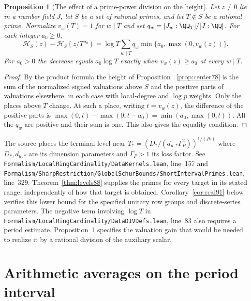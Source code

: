 \documentclass[a4paper,11pt]{article}
\newtheorem{proposition}{Proposition}[section]
\theoremstyle{definition}
\theoremstyle{remark}
\newcommand{\srcloc}[2]{{\small\nolinkurl{#1.lean}}, line~#2}
\numberwithin{equation}{section}
\begin{document}
\begin{proposition}[The effect of a prime-power division on the height]
\label{prop:height88}
Let \(z\ne0\) lie in a number field \(J\), let \(S\) be a set of
rational primes, and let \(T\notin S\) be a rational prime.
Normalize \(v_w(T)=1\) for \(w\mid T\) and set
\(q_w=[J_w:\QQ_T]/[J:\QQ]\). For each integer \(a_0\ge0\),
\[
 \mathcal H_S(z)-\mathcal H_S(z/T^{a_0})
    =\log T\sum_{w\mid T}q_w\min\{a_0,\max(0,v_w(z))\}.
\]
For \(a_0>0\) the decrease equals \(a_0\log T\) exactly when
\(v_w(z)\ge a_0\) at every \(w\mid T\).
\end{proposition}
\begin{proof}
By the product formula the height of Proposition
~\ref{prop:center78} is the sum of the normalized signed
valuations above \(S\) and the positive parts of valuations
elsewhere, in each case with local-degree and \(\log p\) weights.
Only the places above \(T\) change. At such a place, writing
\(t=v_w(z)\), the difference of the positive parts is
\(\max(0,t)-\max(0,t-a_0)=\min(a_0,\max(0,t))\).
All the \(q_w\) are positive and their sum is one. This also
gives the equality condition.
\end{proof}

The source places the terminal level near
\(T_*=(D_*/(d_{u,*}\Gamma_P^2))^{1/(fk)}\) where \(D_*,d_{u,*}\)
are its dimension parameters and \(\Gamma_P>1\) its loss factor.
See \srcloc{Formalism/LocalRingCardinality/DataKernels}{157}
and \srcloc{Formalism/SharpRestriction/GlobalSchurBounds/ShortIntervalPrimes}{329}.
Theorem~\ref{thm:levels88} supplies the primes for every target
in its stated range, independently of how that target is obtained.
Corollary~\ref{cor:real91} below verifies this lower bound for the specified unitary row groups and discrete-series parameters. The negative term involving \(\log T\) in
\srcloc{Formalism/LocalRingCardinality/DataDIVDefs}{83} also
requires a period estimate. Proposition~\ref{prop:height88}
specifies the valuation gain that would be needed to realize it
by a rational division of the auxiliary scalar.

\section{Arithmetic averages on the period interval}\label{nav:g-I-2}
\end{document}
